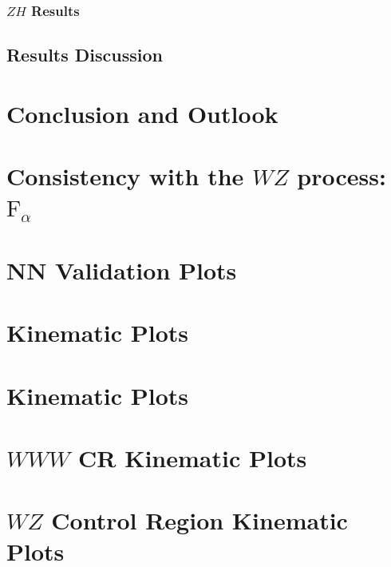 \documentclass{umassthesis}          %
\begin{document}
\subsection{$ZH$ Results}\label{sec:statistical_analysis_stxs_zh_results}

\section{Results Discussion}\label{sec:statistical_analysis_results_discussion}

\chapter{Conclusion and Outlook}\label{ch:conclusions}



\appendix
\chapter{Consistency with the $WZ$ process: \texorpdfstring{$\mathrm{F}_{\alpha}$}{}}\label{app:F_alpha}

\chapter{NN Validation Plots}\label{app:nn_validation_plots}


\chapter{\zdom{} Kinematic Plots}\label{app:zdom_input_plots}

\chapter{\zdep{} Kinematic Plots}\label{app:zdep_input_plots}

\chapter{$WWW$ CR Kinematic Plots}\label{app:wwwcr_input_plots}

\chapter{\texorpdfstring{$WZ$}{WZ} Control Region Kinematic Plots}\label{app:wzcr_input_plots}

\end{document}
